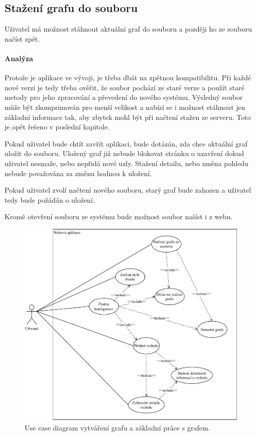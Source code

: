\subsection{Stažení grafu do souboru}
Uživatel má možnost stáhnout aktuální graf do souboru a později ho ze souboru načíst zpět.

\paragraph{Analýza} Protože je aplikace ve vývoji, je třeba dbát na zpětnou kompatibilitu. Při každé nové verzi je tedy třeba ověřit, že soubor pochází ze staré verze a použít staré metody pro jeho zpracování a převedení do nového systému. Výsledný soubor může být zkomprimován pro menší velikost a nabízí se i možnost stáhnout jen základní informace tak, aby zbytek mohl být při načtení stažen ze serveru. Toto je opět řešeno v poslední kapitole.

Pokud uživatel bude chtít zavřít aplikaci, bude dotázán, zda chce aktuální graf uložit do souboru. Uložený graf již nebude blokovat stránku o uzavření dokud uživatel nesmaže, nebo nepřidá nové uzly. Stažení detailu, nebo změna pohledu nebude považována za změnu hodnou k uložení.

Pokud uživatel zvolí načtení nového souboru, starý graf bude zahozen a uživatel tedy bude požádán o uložení.

Kromě otevření souboru ze systému bude možnost soubor našíst i z webu.

\begin{figure}
    \centering
    \includegraphics[width=\textwidth]{media/use-case.pdf}
    \caption{Use case diagram vytváření grafu a základní práce s grafem.}
    \label{fig:use-case}
\end{figure}

